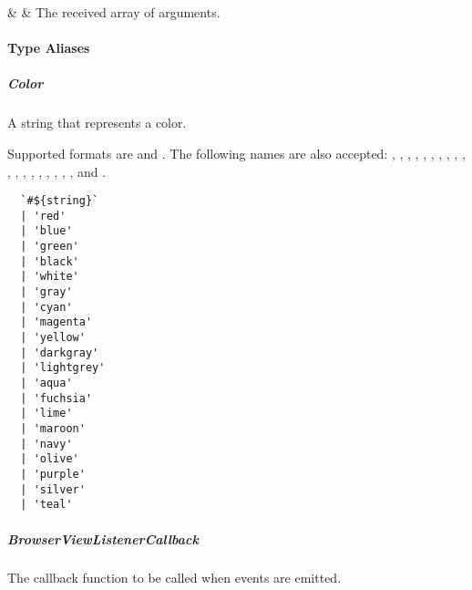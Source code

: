 \begin{interfacedesc}
   &  & The received array of arguments. \\ \hline
\end{interfacedesc}

\newpage

\paragraph{Type Aliases}


\subparagraph{Color}

A string that represents a color.

Supported formats are  and . The following names are also accepted: , , , , , ,
, , , , , , , , , , , , , and .

\begin{verbatim}
  `#${string}`
  | 'red'
  | 'blue'
  | 'green'
  | 'black'
  | 'white'
  | 'gray'
  | 'cyan'
  | 'magenta'
  | 'yellow'
  | 'darkgray'
  | 'lightgrey'
  | 'aqua'
  | 'fuchsia'
  | 'lime'
  | 'maroon'
  | 'navy'
  | 'olive'
  | 'purple'
  | 'silver'
  | 'teal'
\end{verbatim}

\subparagraph{BrowserViewListenerCallback}

The callback function to be called when events are emitted.


\printfn
